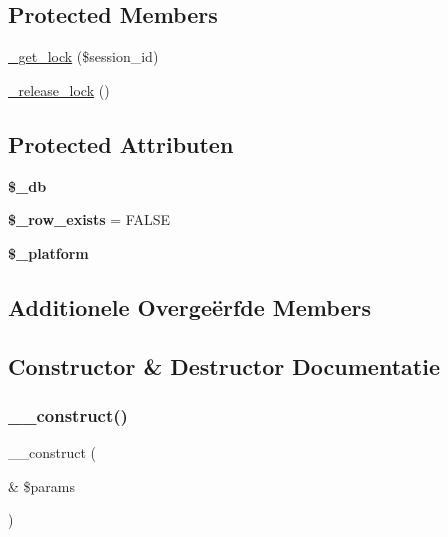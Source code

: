 \subsection*{Protected Members}
\begin{DoxyCompactItemize}
\item 
\mbox{\hyperlink{class_c_i___session__database__driver_a2c49c8e23be3e2aca96a9d20de18ffc2}{\+\_\+get\+\_\+lock}} (\$session\+\_\+id)
\item 
\mbox{\hyperlink{class_c_i___session__database__driver_a0265e356e6cf1eaba229663c1664c37d}{\+\_\+release\+\_\+lock}} ()
\end{DoxyCompactItemize}
\subsection*{Protected Attributen}
\begin{DoxyCompactItemize}
\item 
\mbox{\label{class_c_i___session__database__driver_abc686c23af6ae116b72bc6adb4482a1f}} 
{\bfseries \$\+\_\+db}
\item 
\mbox{\label{class_c_i___session__database__driver_a73dea3734ad53aa2affc8eb734db5525}} 
{\bfseries \$\+\_\+row\+\_\+exists} = F\+A\+L\+SE
\item 
\mbox{\label{class_c_i___session__database__driver_a991522cf981c79f4faf96b16a91f8a3c}} 
{\bfseries \$\+\_\+platform}
\end{DoxyCompactItemize}
\subsection*{Additionele Overge\"{e}rfde Members}


\subsection{Constructor \& Destructor Documentatie}
\mbox{\label{class_c_i___session__database__driver_ac1669c73d53d6f16cf5459a1e84d39c8}} 
\subsubsection{\texorpdfstring{\_\_construct()}{\_\_construct()}}
{\footnotesize\ttfamily \+\_\+\+\_\+construct (\begin{DoxyParamCaption}\item[{\&}]{\$params }\end{DoxyParamCaption})}

